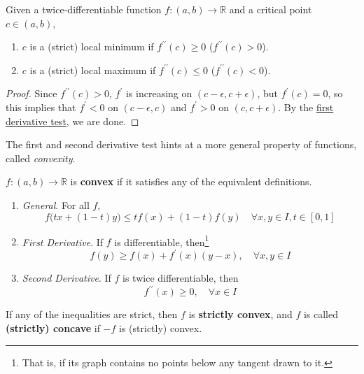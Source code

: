   \begin{theorem}
    \label{thm:second-der-test}
		Given a twice-differentiable function $f: (a, b) \to \mathbb{R}$ and a critical point $c \in (a, b)$, 
		\begin{enumerate}
			\item $c$ is a (strict) local minimum if $f^{\prime\prime} (c) \geq 0$ ($f^{\prime\prime} (c) > 0$). 
			\item $c$ is a (strict) local maximum if $f^{\prime\prime} (c) \leq 0$ ($f^{\prime\prime} (c) < 0$). 
		\end{enumerate}
  \end{theorem}
	\begin{proof}
		Since $f^{\prime\prime} (c) > 0$, $f^\prime$ is increasing on $(c - \epsilon, c + \epsilon)$, but $f^\prime (c) = 0$, so this implies that $f^\prime < 0$ on $(c - \epsilon, c)$ and $f^\prime > 0$ on $(c, c + \epsilon)$. By the \hyperref[thm:first-derivative-test]{first derivative test}, we are done. 
	\end{proof}

	The first and second derivative test hints at a more general property of functions, called \textit{convexity}. 

  \begin{definition}
		\label{def:convex_functions}
		$f: (a, b) \to \mathbb{R}$ is \textbf{convex} if it satisfies any of the equivalent definitions. 
		\begin{enumerate}
		  \item \textit{General}. For all $f$, 
				\begin{equation}
					f\big( tx + (1 - t) y \big) \leq t f(x) + (1 - t) f(y) \quad \forall x, y \in I, t \in [0, 1]
				\end{equation}

			\item \textit{First Derivative}. If $f$ is differentiable, then\footnote{That is, if its graph contains no points below any tangent drawn to it. } 
				\begin{equation}
				  f(y) \geq f(x) + f^\prime (x) (y - x), \quad \forall x, y \in I
				\end{equation}

			\item \textit{Second Derivative}. If $f$ is twice differentiable, then 
				\begin{equation}
					f^{\prime\prime} (x) \geq 0, \quad \forall x \in I
				\end{equation}
		\end{enumerate}
		If any of the inequalities are strict, then $f$ is \textbf{strictly convex}, and $f$ is called \textbf{(strictly) concave} if $-f$ is (strictly) convex. 
  \end{definition}


